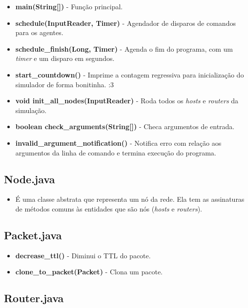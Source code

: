 \documentclass[11pt]{article}
\begin{document}
\begin{itemize}
	\item \textbf{main(String[])} - Função principal.
	\item \textbf{schedule(InputReader, Timer)} - Agendador de disparos de comandos para os agentes.
	\item \textbf{schedule_finish(Long, Timer)} - Agenda o fim do programa, com um \textit{timer} e um disparo em segundos.
	\item \textbf{start_countdown()} - Imprime a contagem regressiva para inicialização do simulador de forma bonitinha. :3
	\item \textbf{void init_all_nodes(InputReader)} - Roda todos os \textit{hosts} e \textit{routers} da simulação.
	\item \textbf{boolean check_arguments(String[])} - Checa argumentos de entrada.
	\item \textbf{invalid_argument_notification()} - Notifica erro com relação aos argumentos da linha de comando e termina execução do programa.
\end{itemize}

\subsection{Node.java}

\begin{itemize}
	\item É uma classe abstrata que representa um nó da rede. Ela tem as assinaturas de métodos comuns às entidades que são nós (\textit{hosts} e \textit{routers}).
\end{itemize}


\subsection{Packet.java}

\begin{itemize}
	\item \textbf{decrease_ttl()} - Diminui o TTL do pacote.
	\item \textbf{clone_to_packet(Packet)} - Clona um pacote.
\end{itemize}

\subsection{Router.java}
\end{document}
